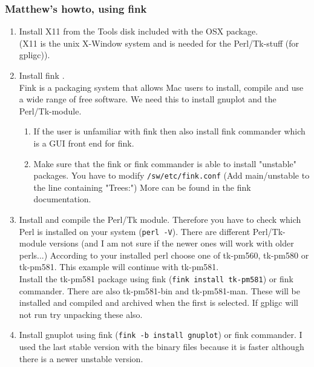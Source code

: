 \subsubsection{Matthew's howto, using fink}
\label{fink}
\begin{enumerate}

\item  Install X11 from the Tools disk included with the OSX package. \\
(X11 is the unix X-Window system and is needed for the  Perl/Tk-stuff (for gpligc)).

\item  Install fink \cite{fink}. \\
Fink is a packaging system that allows Mac users to install, compile and use a wide range of free software.
We need this to install gnuplot and the Perl/Tk-module.

    \begin{enumerate}
        \item  If the user is unfamiliar with fink then also install fink
                commander which is a GUI front end for fink.
        \item  Make sure that the fink or fink commander is able to install
            "unstable" packages.
            You have to modify \texttt{/sw/etc/fink.conf} (Add main/unstable to the line containing "Trees:")
            More can be found in the fink documentation.
    \end{enumerate}

\item  Install and compile the Perl/Tk module. Therefore you have to check which Perl is installed on your system (\texttt{perl -V}).
    There are different Perl/Tk-module versions (and I am not sure if the newer ones will work with older perls...)
    According to your installed perl choose one of tk-pm560, tk-pm580 or tk-pm581. This example will continue with tk-pm581.\\

Install the tk-pm581 package using fink (\texttt{fink install tk-pm581}) or fink
commander.  There are also tk-pm581-bin and tk-pm581-man.  These will
be installed and compiled and archived when the first is selected.  If
gpligc will not run try unpacking these also.

\item  Install gnuplot using fink (\texttt{fink -b install gnuplot}) or fink commander.  I used the last
stable version with the binary files because it is faster although
there is a newer unstable version.


\end{enumerate}
